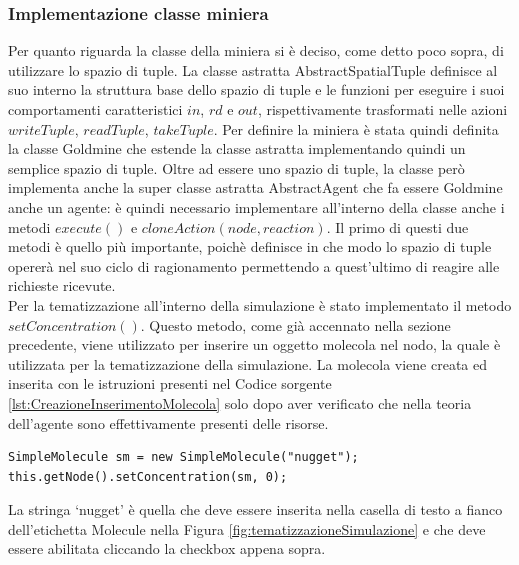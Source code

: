\subsubsection{Implementazione classe miniera}
Per quanto riguarda la classe della miniera si è deciso, come detto poco sopra, di utilizzare lo spazio di tuple. La classe astratta AbstractSpatialTuple definisce al suo interno la struttura base dello spazio di tuple e le funzioni per eseguire i suoi comportamenti caratteristici $in$, $rd$ e $out$, rispettivamente trasformati nelle azioni $writeTuple$, $readTuple$, $takeTuple$.
Per definire la miniera è stata quindi definita la classe Goldmine che estende la classe astratta implementando quindi un semplice spazio di tuple.
Oltre ad essere uno spazio di tuple, la classe però implementa anche la super classe astratta AbstractAgent che fa essere Goldmine anche un agente: è quindi necessario implementare all'interno della classe anche i metodi $execute()$ e $cloneAction(node, reaction)$. Il primo di questi due metodi è quello più importante, poichè definisce in che modo lo spazio di tuple opererà nel suo ciclo di ragionamento permettendo a quest'ultimo di reagire alle richieste ricevute.
\\
Per la tematizzazione all'interno della simulazione è stato implementato il metodo $setConcentration()$. Questo metodo, come già accennato nella sezione precedente, viene utilizzato per inserire un oggetto molecola nel nodo, la quale è utilizzata per la tematizzazione della simulazione. La molecola viene creata ed inserita con le istruzioni presenti nel Codice sorgente \ref{lst:CreazioneInserimentoMolecola} solo dopo aver verificato che nella teoria dell'agente sono effettivamente presenti delle risorse.
\medskip
\begin{lstlisting}[firstnumber=1,label={lst:CreazioneInserimentoMolecola},caption={Creazione e inserimento molecola}]
SimpleMolecule sm = new SimpleMolecule("nugget");
this.getNode().setConcentration(sm, 0);
\end{lstlisting}
La stringa `nugget' è quella che deve essere inserita nella casella di testo a fianco dell'etichetta Molecule nella Figura \ref{fig:tematizzazioneSimulazione} e che deve essere abilitata cliccando la checkbox appena sopra.
\newline

